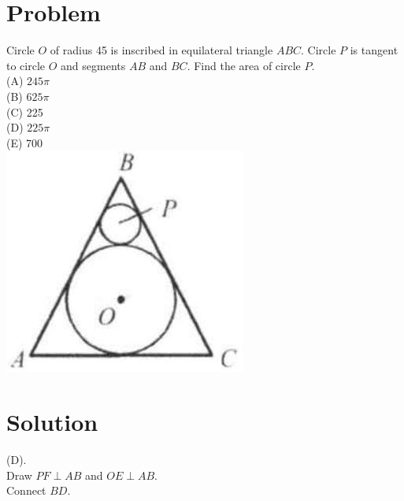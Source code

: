\documentclass{article}
\begin{document}
\section*{Problem}
Circle \(O\) of radius 45 is inscribed in equilateral triangle \(A B C\). Circle \(P\) is tangent to circle \(O\) and segments \(A B\) and \(B C\). Find the area of circle \(P\).\\
(A) \(245 \pi\)\\
(B) \(625 \pi\)\\
(C) 225\\
(D) \(225 \pi\)\\
(E) 700\\
\centering
\includegraphics[width=\textwidth]{images/184.jpg}

\section*{Solution}
(D).\\
Draw \(P F \perp A B\) and \(O E \perp A B\).\\
Connect \(B D\).
\end{document}
